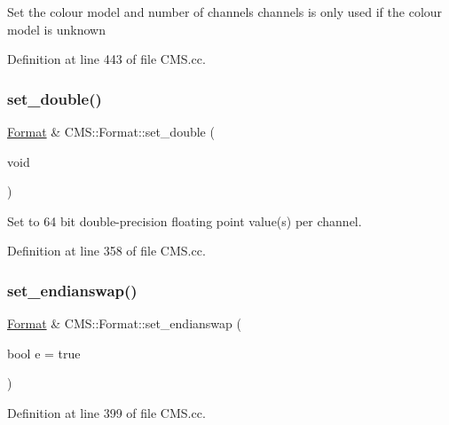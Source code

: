 Set the colour model and number of channels \textquotesingle{}channels\textquotesingle{} is only used if the colour model is unknown 

Definition at line 443 of file C\+M\+S.\+cc.

\mbox{\label{class_c_m_s_1_1_format_a36fd3017b0985604b06fa40931f7c8cc}} 
\subsubsection{\texorpdfstring{set\+\_\+double()}{set\_double()}}
{\footnotesize\ttfamily \hyperlink{class_c_m_s_1_1_format}{Format} \& C\+M\+S\+::\+Format\+::set\+\_\+double (\begin{DoxyParamCaption}\item[{void}]{ }\end{DoxyParamCaption})}



Set to 64 bit double-\/precision floating point value(s) per channel. 



Definition at line 358 of file C\+M\+S.\+cc.

\mbox{\label{class_c_m_s_1_1_format_a65bf5b0b92c59a67bb8bf2b6578a4ec0}} 
\subsubsection{\texorpdfstring{set\+\_\+endianswap()}{set\_endianswap()}}
{\footnotesize\ttfamily \hyperlink{class_c_m_s_1_1_format}{Format} \& C\+M\+S\+::\+Format\+::set\+\_\+endianswap (\begin{DoxyParamCaption}\item[{bool}]{e = {\ttfamily true} }\end{DoxyParamCaption})}



Definition at line 399 of file C\+M\+S.\+cc.

\mbox{\label{class_c_m_s_1_1_format_aa69b3e70d5dd930cae560d9fc316147c}} 
